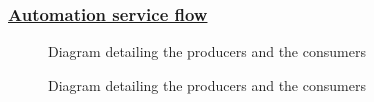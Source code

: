 \subsubsection*{\underline{Automation service flow}}
\begin{figure}[H]
	\centering
	\caption{Diagram detailing the producers and the consumers}
	\label{fig:send-invite-sequence-diagram}
\end{figure}
\begin{figure}[H]
	\centering
	\caption{Diagram detailing the producers and the consumers}
	\label{fig:handle-inbox-sequence-diagram}
\end{figure}
